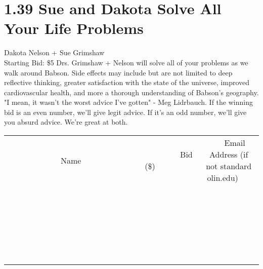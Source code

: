 \documentclass[11pt]{article}
\begin{document}
\section*{1.39 Sue and Dakota Solve All Your Life Problems}
Dakota Nelson + Sue Grimshaw
\\
Starting Bid: \$5
\newline
Drs. Grimshaw + Nelson will solve all of your problems as we walk around Babson. Side effects may include but are not limited to deep reflective thinking, greater satisfaction with the state of the universe, improved cardiovascular health, and more a thorough understanding of Babson's geography. "I mean, it wasn't the worst advice I've gotten" - Meg Lidrbauch. If the winning bid is an even number, we'll give legit advice. If it's an odd number, we'll give you absurd advice. We're great at both.
\\[6ex]
\begin{tabular}{c c c}
~~~~~~~~~~~~~Name~~~~~~~~~~~~~ & ~~~~~~~~~Bid (\$)~~~~~~~~~  & ~~~Email Address (if not standard olin.edu)~~~\\
 & & \\
\hline
 & & \\
\hline
 & & \\
\hline
 & & \\
\hline
 & & \\
\hline
 & & \\
\hline
 & & \\
\hline
 & & \\
\hline
 & & \\
\hline
 & & \\
\hline
 & & \\
\hline
 & & \\
\hline
 & & \\
\hline
 & & \\
\hline
 & & \\
\hline
 & & \\
\hline
 & & \\
\hline
 & & \\
\hline
 & & \\
\hline
 & & \\
\hline
 & & \\
\hline
 & & \\
\hline
 & & \\
\hline
 & & \\
\hline
 & & \\
\hline
 & & \\
\hline
\end{tabular}
\newpage
\end{document}
